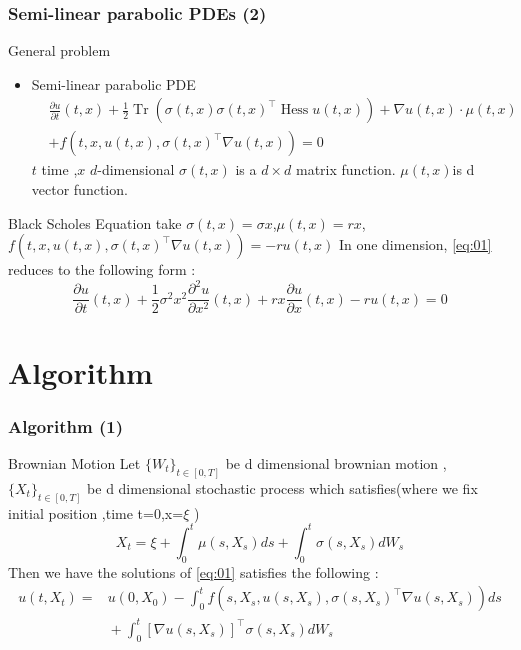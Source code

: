 \documentclass[mathserif,10pt]{beamer}
\DeclareMathOperator{\Hessian}{Hess}
\DeclareMathOperator{\Tr}{Tr}
\begin{document}
\begin{frame}
\frametitle{Semi-linear parabolic PDEs (2)}
\begin{block}{General problem}
\begin{itemize}
\item Semi-linear parabolic PDE
\begin{align}
    & \frac{\partial u}{\partial t}(t,x)+\frac{1}{2}
    \Tr(\sigma(t,x)\sigma(t,x)^\intercal
    \Hessian u(t,x))
    +\nabla u(t,x)\cdot \mu(t,x) \nonumber \\ 
&  +f(t,x,u(t,x),\sigma(t,x)^\intercal\nabla u(t,x)) = \label{eq:01} 0 
\end{align}
$t$ time ,$x$ $d$-dimensional 
$\sigma(t,x)$ is a $d \times d$  matrix function.
$\mu(t,x)$is d vector function.
\end{itemize}
\end{block}
\begin{block}{Black Scholes Equation}
take $\sigma(t,x)=\sigma x$,$\mu(t,x)=rx$,
$f(t,x,u(t,x),\sigma(t,x)^\intercal\nabla u(t,x))=-ru(t,x)$
In one dimension, \eqref{eq:01} reduces to the following form :
\begin{equation*}
    \frac{\partial u}{\partial t}(t,x)+\frac{1}{2}
    \sigma^2x^2
     \frac{\partial^2 u}{\partial x^2}(t,x)
     +rx\frac{\partial u}{\partial x}(t,x)
    -ru(t,x)=0
\end{equation*}
\end{block}
\end{frame}


\section{Algorithm}
\begin{frame}
\frametitle{Algorithm (1)}
\begin{block}{Brownian Motion}
Let $\{W_t\}_{t\in [0,T]}$ be d dimensional brownian motion ,$\{X_t\}_{t\in [0,T]}$ be d dimensional stochastic process which satisfies(where we fix initial position ,time t=0,x=$\xi$ )
\begin{equation}
\label{eq:05}
    X_t=\xi+\int_{0}^{t}\mu(s,X_s)ds+\int_{0}^{t}\sigma(s,X_s)dW_s
\end{equation}
Then we have the solutions of \eqref{eq:01} satisfies the following :
\begin{align}
u(t,X_t)
=& \nonumber
u(0,X_0)-\int_{0}^{t}f(s,X_s,u(s,X_s),\sigma(s,X_s)^\intercal\nabla u(s,X_s))ds\\
&{}  \label{eq:06}
+\int_{0}^{t}[\nabla u(s,X_s)]^\intercal\sigma(s,X_s)dW_s
\end{align}
\end{block}
\end{frame}
\end{document}

